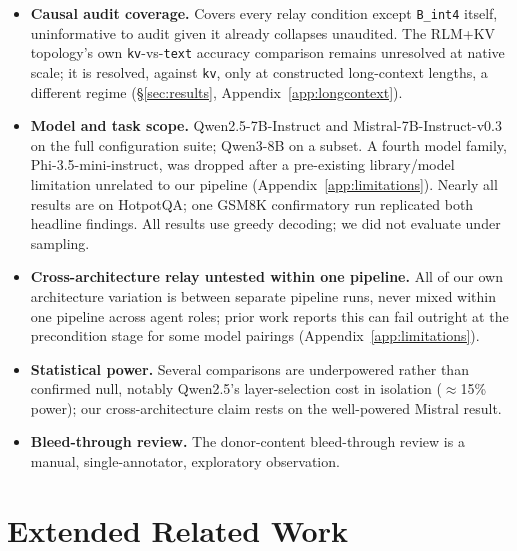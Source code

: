 \documentclass[11pt]{article}
\begin{document}
\begin{itemize}[leftmargin=*]
accounting reflects what a distributed deployment would need to send,
not a measured latency speedup, and smaller caches are not observed to
be faster in our setup, since every transformer layer still runs
regardless of injected-cache size (Appendix~\ref{app:limitations}).
\item \textbf{Causal audit coverage.} Covers every relay condition
except \texttt{B\_int4} itself, uninformative to audit given it already
collapses unaudited. The RLM+KV topology's own \texttt{kv}-vs-\texttt{text}
accuracy comparison remains unresolved at native scale; it is resolved,
against \texttt{kv}, only at constructed long-context lengths, a
different regime (\S\ref{sec:results}, Appendix~\ref{app:longcontext}).
\item \textbf{Model and task scope.} Qwen2.5-7B-Instruct and
Mistral-7B-Instruct-v0.3 on the full configuration suite; Qwen3-8B on a
subset. A fourth model family, Phi-3.5-mini-instruct, was dropped after
a pre-existing library/model limitation unrelated to our pipeline
(Appendix~\ref{app:limitations}). Nearly all results are on HotpotQA; one
GSM8K confirmatory run replicated both headline findings. All results
use greedy decoding; we did not evaluate under sampling.
\item \textbf{Cross-architecture relay untested within one pipeline.}
All of our own architecture variation is between separate pipeline
runs, never mixed within one pipeline across agent roles; prior work
reports this can fail outright at the precondition stage for some model
pairings (Appendix~\ref{app:limitations}).
\item \textbf{Statistical power.} Several comparisons are underpowered
rather than confirmed null, notably Qwen2.5's layer-selection cost in
isolation ($\approx$15\% power); our cross-architecture claim rests on
the well-powered Mistral result.
\item \textbf{Bleed-through review.} The donor-content bleed-through
review is a manual, single-annotator, exploratory observation.
\end{itemize}




\appendix

\section{Extended Related Work}
\label{app:relwork}
\end{document}
